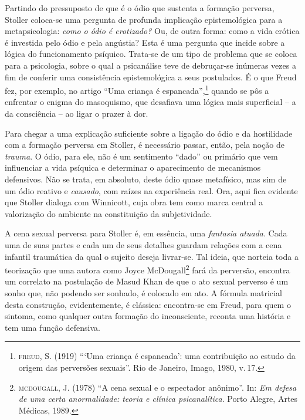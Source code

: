 Partindo do pressuposto de que é o ódio que sustenta a formação
perversa, Stoller coloca-se uma pergunta de profunda implicação
epistemológica para a metapsicologia: \emph{como o ódio é erotizado?}
Ou, de outra forma: como a vida erótica é investida pelo ódio e pela
angústia? Esta é uma pergunta que incide sobre a lógica do funcionamento
psíquico. Trata-se de um tipo de problema que se coloca para a
psicologia, sobre o qual a psicanálise teve de debruçar-se inúmeras
vezes a fim de conferir uma consistência epistemológica a seus
postulados. É o que Freud fez, por exemplo, no artigo ``Uma criança é
espancada'',\footnote{\textsc{freud}, S. (1919) ```Uma criança é
  espancada': uma contribuição ao estudo da origem das perversões
  sexuais''.  Rio de Janeiro, Imago, 1980, v.\,17.} quando
se pôs a enfrentar o enigma do masoquismo, que desafiava uma lógica mais
superficial -- a da consciência -- ao ligar o prazer à dor.

Para chegar a uma explicação suficiente sobre a ligação do ódio e da
hostilidade com a formação perversa em Stoller, é necessário passar,
então, pela noção de \emph{trauma}. O ódio, para ele, não é um
sentimento ``dado'' ou primário que vem influenciar a vida psíquica e
determinar o aparecimento de mecanismos defensivos. Não se trata, em
absoluto, deste ódio quase metafísico, mas sim de um ódio reativo e
\emph{causado}, com raízes na experiência real. Ora, aqui fica evidente
que Stoller dialoga com Winnicott, cuja obra tem como marca central a
valorização do ambiente na constituição da subjetividade.

A cena sexual perversa para Stoller é, em essência, uma \emph{fantasia
atuada}. Cada uma de suas partes e cada um de seus detalhes guardam
relações com a cena infantil traumática da qual o sujeito deseja
livrar-se. Tal ideia, que norteia toda a teorização que uma autora como
Joyce McDougall\footnote{\textsc{mcdougall}, J. (1978) ``A cena sexual e
  o espectador anônimo''. In: \emph{Em defesa de uma certa anormalidade:
  teoria e clínica psicanalítica}. Porto Alegre, Artes Médicas, 1989.}
fará da perversão, encontra um correlato na postulação de Masud Khan de
que o ato sexual perverso é um sonho que, não podendo ser sonhado, é
colocado em ato. A fórmula matricial desta construção, evidentemente, é
clássica: encontra-se em Freud, para quem o sintoma, como qualquer outra
formação do inconsciente, reconta uma história e tem uma função
defensiva.

